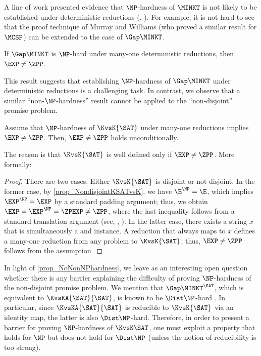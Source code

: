 \documentclass{toc}
\begin{document}
A line of work presented evidence that $\NP$-hardness of $\MINKT$ is not likely to be established under
deterministic reductions (\eg, \cite{Ko91_siamcomp_journals, MurrayW17_toc_journals, HitchcockP15_fsttcs_conf, HiraharaW16_coco_conf}).
For example, it is not hard to see that the proof technique of Murray and Williams \cite{MurrayW17_toc_journals} (who proved a similar result for $\MCSP$)
can be extended to the case of $\Gap\MINKT$.
\begin{theorem}
  If $\Gap\MINKT$ is $\NP$-hard under many-one deterministic reductions,
  then
  $\EXP \neq \ZPP$.
\end{theorem}
This result suggests that establishing $\NP$-hardness of $\Gap\MINKT$ under deterministic reductions is a challenging task.
In contrast,
we observe that a similar ``non-$\NP$-hardness'' result cannot be applied to
the ``non-disjoint'' promise problem.
\begin{proposition}
  \label{prop_NoNonNPhardness}
  Assume that
  $\NP$-hardness of $\KvsK{\SAT}$
  under many-one reductions
  implies $\EXP \neq \ZPP$.
  Then, $\EXP \neq \ZPP$ holds unconditionally.
\end{proposition}
The reason is that $\KvsK{\SAT}$ is well defined only if $\EXP \neq \ZPP$.  More formally:
\begin{proof}
  There are two cases.
  Either $\KvsK{\SAT}$ is disjoint or not disjoint.
  In the former case, by \cref{prop_NondisjointKSATvsK}, we have $\E^\NP = \E$,
  which implies $\EXP^\NP = \EXP$ by a standard padding argument;
  thus, we obtain $\EXP = \EXP^\NP = \ZPEXP \neq \ZPP$,
  where the last inequality follows from a standard translation argument (see, \eg, \cite{BuhrmanFS09_icalp_conf}).
  In the latter case, there exists a string $x$ that is simultaneously a \Yes and \No instance.
  A reduction that always maps to $x$ defines a many-one reduction from any problem to
  $\KvsK{\SAT}$; thus, $\EXP \neq \ZPP$ follows from the assumption.
\end{proof}

In light of \cref{prop_NoNonNPhardness}, we leave as an interesting open question whether
there is any barrier explaining
the difficulty of proving $\NP$-hardness of the non-disjoint promise problem.
We mention that
$\Gap\MINKT^\SAT$, which is equivalent to
$\KvsKA{\SAT}{\SAT}$,
is known to be $\Dist\NP$-hard \cite{Hirahara20_stoc_conf}.
In particular, since $\KvsKA{\SAT}{\SAT}$ is reducible to $\KvsK{\SAT}$ via an identity map,
the latter is also $\Dist\NP$-hard.
Therefore, in order to present a barrier for proving $\NP$-hardness of $\KvsK\SAT$,
one must exploit a property that holds for $\NP$ but does not hold for $\Dist\NP$
(unless the notion of reducibility is too strong).
\end{document}
